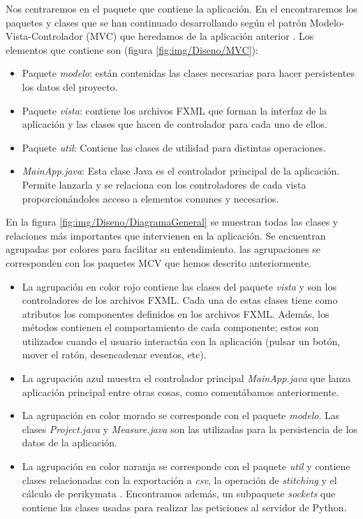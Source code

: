 Nos centraremos en el paquete que contiene la aplicación. En el encontraremos los paquetes y clases que se han continuado desarrollando según el patrón Modelo-Vista-Controlador (MVC) que heredamos de la aplicación anterior \cite{perikymataV1}. Los elementos que contiene son (figura \ref{fig:img/Diseno/MVC}):
\begin{itemize}     
    \item Paquete \textit{modelo}: están contenidas las clases necesarias para hacer persistentes los datos del proyecto.
    \item Paquete \textit{vista}: contiene los archivos FXML que forman la interfaz de la aplicación y las clases que hacen de controlador para cada uno de ellos.
    \item Paquete \textit{util}: Contiene las clases de utilidad para distintas operaciones.
    \item \textit{MainApp.java}: Esta clase Java es el controlador principal de la aplicación. Permite lanzarla y se relaciona con los controladores de cada vista proporcionándoles acceso a elementos comunes y necesarios.
\end{itemize}

\pagebreak
En la figura \ref{fig:img/Diseno/DiagramaGeneral} se muestran todas las clases y relaciones más importantes que intervienen en la aplicación. Se encuentran agrupadas por colores para facilitar su entendimiento. las agrupaciones se corresponden con los paquetes MCV que hemos descrito anteriormente.


\begin{itemize}

    \item La agrupación en color rojo contiene las clases del paquete \textit{vista} y son los controladores de los archivos FXML. Cada una de estas clases tiene como atributos los componentes definidos en los archivos FXML. Además, los métodos contienen el comportamiento de cada componente; estos son utilizados cuando el usuario interactúa con la aplicación (pulsar un botón, mover el ratón, desencadenar eventos, etc).
    \item La agrupación azul muestra el controlador principal \textit{MainApp.java} que lanza aplicación principal entre otras cosas, como comentábamos anteriormente.
    \item La agrupación en color morado se corresponde con el paquete \textit{modelo}. Las clases \textit{Project.java} y \textit{Measure.java} son las utilizadas para la persistencia de los datos de la aplicación.
    \item La agrupación en color naranja se corresponde con el paquete \textit{util} y contiene clases relacionadas con la exportación a \textit{csv}, la operación de \textit{stitching} y el cálculo de perikymata . Encontramos además, un subpaquete \textit{sockets} que contiene las clases usadas para realizar las peticiones al servidor de Python.   
\end{itemize}

